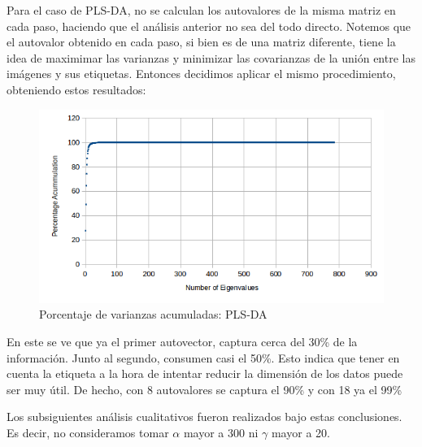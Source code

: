 Para el caso de PLS-DA, no se calculan los autovalores de la misma matriz en cada paso, haciendo que el an\'alisis anterior no sea del todo directo. Notemos que el autovalor obtenido en cada paso, si bien es de una matriz diferente, tiene la idea de maximimar las varianzas y minimizar las covarianzas de la uni\'on entre las im\'agenes y sus etiquetas. Entonces decidimos aplicar el mismo procedimiento, obteniendo estos resultados:

\newpage

\begin{figure}[h!]
  \begin{center}
	\includegraphics[scale=1]{exp4/PLSDA-percentage.png}
	\caption{Porcentaje de varianzas acumuladas: PLS-DA}
	\label{accum_var_PLSDA}
  \end{center}
\end{figure}

En este se ve que ya el primer autovector, captura cerca del 30\% de la informaci\'on. Junto al segundo, consumen casi el 50\%. Esto indica que tener en cuenta la etiqueta a la hora de intentar reducir la dimensi\'on de los datos puede ser muy \'util. De hecho, con 8 autovalores se captura el 90\% y con 18 ya el 99\%

Los subsiguientes an\'alisis cualitativos fueron realizados bajo estas conclusiones. Es decir, no consideramos tomar $\alpha$ mayor a 300 ni $\gamma$ mayor a 20.
